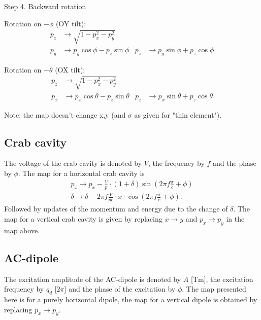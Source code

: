 \documentclass[english]{article}
\begin{document}
Step 4. Backward rotation

Rotation on $-\phi$ (OY tilt):
\begin{align}
p_z & \to \sqrt{1-p_x^2-p_y^2} \\
p_y & \to   p_y \cos \phi - p_z \sin\phi &
p_z & \to   p_y \sin \phi + p_z \cos\phi 
\end{align}

Rotation on $-\theta$ (OX tilt):
\begin{align}
p_z & \to \sqrt{1-p_x^2-p_y^2} \\
p_x & \to   p_x \cos \theta - p_z \sin\theta &
p_z & \to   p_x \sin \theta + p_z \cos\theta 
\end{align}

Note: the map doesn't change x,y (and $\sigma$ as given for "thin element"). 

\subsection{Crab cavity}
The voltage of the crab cavity is denoted by $V$, the frequency by $f$ and the phase by $\phi$. The map for a horizontal
crab cavity is
\begin{align}
    p_x \to p_x - \frac{V}{p}\cdot(1+\delta) \sin\left(2\pi f\frac{\sigma}{c}+\phi \right) \\
    \delta \to \delta - 2\pi f \frac{V}{pc}\cdot x \cdot \cos\left(2\pi f \frac{\sigma}{c}+\phi\right).
\end{align}
Followed by updates of the momentum and energy due to the change of $\delta$. The map for a vertical crab cavity
is given by replacing $x\to y$ and $p_x\to p_y$ in the map above.

\subsection{AC-dipole}
The excitation amplitude of the AC-dipole is denoted by $A$ [Tm], the excitation frequency by $q_d$ [$2\pi$] and the phase of the excitation by $\phi$. The map
presented here is for a purely horizontal dipole, the map for a vertical dipole is obtained by replacing $p_x\to p_y$.
\end{document}
